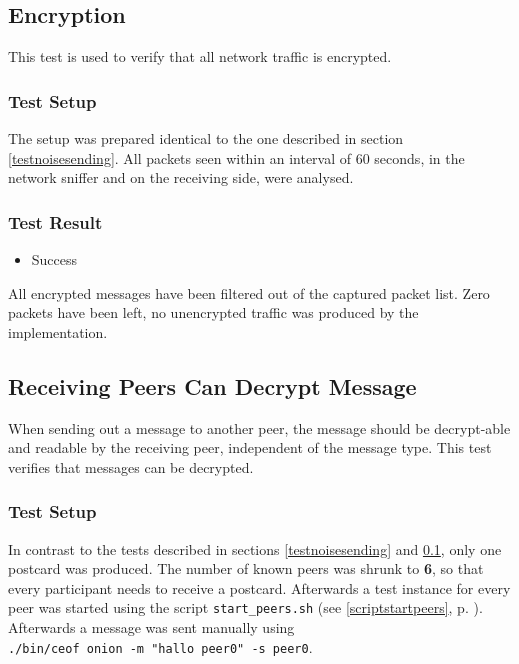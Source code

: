 \subsection{Encryption}
\label{testencryption}
This test is used to verify that all network traffic is encrypted.
\subsubsection{Test Setup}
The setup was prepared identical to the one described
in section \ref{testnoisesending}. All packets seen within
an interval of 60 seconds, in the network sniffer and on 
the receiving side, were analysed.
\subsubsection{Test Result}
\begin{itemize}
\item Success
\end{itemize}
All encrypted messages have been filtered out of the captured
packet list. Zero packets have been left, no unencrypted traffic
was produced by the implementation.
\subsection{Receiving Peers Can Decrypt Message}
When sending out a message to another peer, the message should
be decrypt-able and readable by the receiving peer, independent of the
message type. This test verifies that messages can be decrypted.
\subsubsection{Test Setup}
In contrast to the tests described in sections
\ref{testnoisesending} and \ref{testencryption}, only
one postcard was produced. The number of known peers was shrunk
to \textbf{6}, so that every participant needs to receive a postcard.
Afterwards a test instance for every peer was started using
the script \verb=start_peers.sh= (see \ref{scriptstartpeers}, p.
\pageref{scriptstartpeers}).
Afterwards a message was sent manually using
\\ \verb=./bin/ceof onion -m "hallo peer0" -s peer0=.
